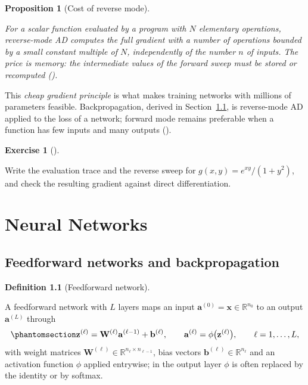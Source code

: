 \documentclass[
  english,
  11pt,
  a4paper,
  twoside,
  open=any,
  numbers=noenddot]{scrbook}
\theoremstyle{plain}
\theoremstyle{plain}
\newtheorem{proposition}{Proposition}[chapter]
\theoremstyle{plain}
\theoremstyle{definition}
\newtheorem{definition}{Definition}[chapter]
\theoremstyle{definition}
\newtheorem{exercise}{Exercise}[chapter]
\theoremstyle{definition}
\theoremstyle{remark}
\begin{document}
\begin{proposition}[Cost of reverse
mode]\protect\hypertarget{prp-reverse-cost}{}\label{prp-reverse-cost}

For a scalar function evaluated by a program with \(N\) elementary
operations, reverse-mode AD computes the full gradient with a number of
operations bounded by a small constant multiple of \(N\), independently
of the number \(n\) of inputs. The price is memory: the intermediate
values of the forward sweep must be stored or recomputed
().

\end{proposition}

This \emph{cheap gradient principle} is what makes training networks
with millions of parameters feasible. Backpropagation, derived in
Section~\ref{sec-neural-networks-feedforward-networks-and-backpropagation},
is reverse-mode AD applied to the loss of a network; forward mode
remains preferable when a function has few inputs and many outputs
().

\begin{exercise}[]\protect\hypertarget{exr-ad-trace}{}\label{exr-ad-trace}

Write the evaluation trace and the reverse sweep for
\(g(x, y) = e^{xy}/(1 + y^2)\), and check the resulting gradient against
direct differentiation.

\end{exercise}


\chapter{Neural Networks}\label{sec-neural-networks}

\section{Feedforward networks and
backpropagation}\label{sec-neural-networks-feedforward-networks-and-backpropagation}

\begin{definition}[Feedforward
network]\protect\hypertarget{def-mlp}{}\label{def-mlp}

A feedforward network with \(L\) layers maps
an input \(\mathbf{a}^{(0)} = \mathbf{x}\in\mathbb{R}^{n_0}\) to an
output \(\mathbf{a}^{(L)}\) through
\begin{equation}\protect\phantomsection\label{eq-mlp}{
\mathbf{z}^{(\ell)} = \mathbf{W}^{(\ell)}\mathbf{a}^{(\ell-1)} + \mathbf{b}^{(\ell)},\qquad \mathbf{a}^{(\ell)} = \phi\big(\mathbf{z}^{(\ell)}\big),\qquad \ell = 1,\dots,L,
}\end{equation} with weight matrices
\(\mathbf{W}^{(\ell)}\in\mathbb{R}^{n_\ell\times n_{\ell-1}}\), bias
vectors \(\mathbf{b}^{(\ell)}\in\mathbb{R}^{n_\ell}\) and an activation
function \(\phi\) applied entrywise; in the output layer \(\phi\) is
often replaced by the identity or by softmax.

\end{definition}
\end{document}
